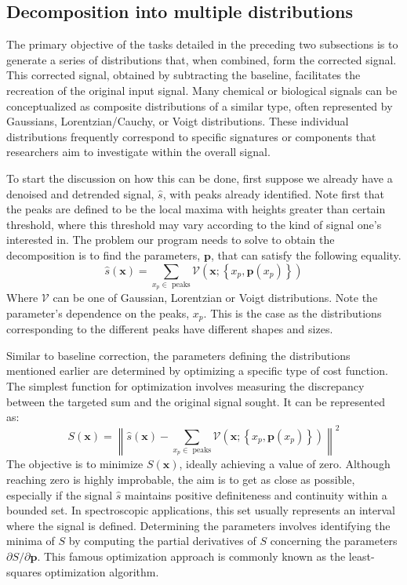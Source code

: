 \documentclass{article}
\begin{document}
\subsection{Decomposition into multiple distributions}
The primary objective of the tasks detailed in the preceding two subsections is to generate a series of distributions that, when combined, form the corrected signal.
This corrected signal, obtained by subtracting the baseline, facilitates the recreation of the original input signal.
Many chemical or biological signals can be conceptualized as composite distributions of a similar type, often represented by Gaussians, Lorentzian/Cauchy, or Voigt distributions.
These individual distributions frequently correspond to specific signatures or components that researchers aim to investigate within the overall signal.

To start the discussion on how this can be done, first suppose we already have a denoised and detrended signal, $\hat{s}$, with peaks already identified.
Note first that the peaks are defined to be the local maxima with heights greater than certain threshold, where this threshold may vary according to the kind of signal one's interested in.
The problem our program needs to solve to obtain the decomposition is to find the parameters, $\mathbf{p}$, that can satisfy the following equality.
\begin{equation}
    \label{eq:decomposition}
    \hat{s}(\mathbf{x}) = \sum_{x_p\in \text{ peaks}} \mathcal{V}(\mathbf{x};\left\{x_p, \mathbf{p}\left(x_p\right)\right\})
\end{equation}
Where $\mathcal{V}$ can be one of Gaussian, Lorentzian or Voigt distributions.
Note the parameter's dependence on the peaks, $x_p$.
This is the case as the distributions corresponding to the different peaks have different shapes and sizes.

Similar to baseline correction, the parameters defining the distributions mentioned earlier are determined by optimizing a specific type of cost function.
The simplest function for optimization involves measuring the discrepancy between the targeted sum and the original signal sought. It can be represented as:
\begin{equation*}
    S(\mathbf{x}) = \left\|\hat{s}(\mathbf{x}) - \sum_{x_p\in \text{ peaks}} \mathcal{V}\left(\mathbf{x};\left\{x_p, \mathbf{p}\left(x_p\right)\right\}\right) \right\|^2
\end{equation*}
The objective is to minimize $S(\mathbf{x})$, ideally achieving a value of zero.
Although reaching zero is highly improbable, the aim is to get as close as possible, especially if the signal $\hat{s}$ maintains positive definiteness and continuity within a bounded set.
In spectroscopic applications, this set usually represents an interval where the signal is defined.
Determining the parameters involves identifying the minima of $S$ by computing the partial derivatives of $S$ concerning the parameters $\partial S / \partial \mathbf{p}$.
This famous optimization approach is commonly known as the least-squares optimization algorithm.
\end{document}
